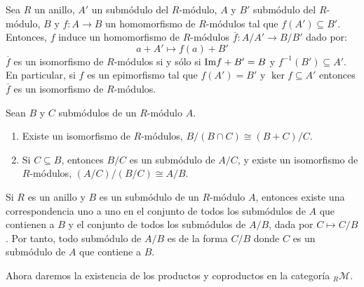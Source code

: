 \documentclass[12pt]{report}
\newcounter{it}
\theoremstyle{largebreak}
\newcommand\cf[3]{\ensuremath{#1:#2\rightarrow#3}}
\newcommand{\im}{\ensuremath{\textup{Im}}}
\begin{document}
    \begin{cor}
        Sea $R$ un anillo, $A'$ un submódulo del $R$-módulo, $A$ y $B'$ submódulo del $R$-módulo, $B$ y $\cf{f}{A}{B}$ un homomorfismo de $R$-módulos tal que $f(A')\subseteq B'$. Entonces, $f$ induce un homomorfismo de $R$-módulos $\cf{\overline{f}}{A/A'}{B/B'}$ dado por:
        \begin{equation*}
            a+A'\mapsto f(a)+B'
        \end{equation*}
        $\overline{f}$ es un isomorfismo de $R$-módulos si y sólo si $\im f+B'=B$ y $f^{-1}(B')\subseteq A'$. En particular, si $f$ es un epimorfismo tal que $f(A')=B'$ y $\ker f\subseteq A'$ entonces $\overline{f}$ es un isomorfismo de $R$-módulos.
    \end{cor}

    \begin{theor}
        Sean $B$ y $C$ submódulos de un $R$-módulo $A$.
        \begin{enumerate}[label = \textit{(\alph*)}]
            \item Existe un isomorfismo de $R$-módulos, $B/(B\cap C)\cong (B+C)/C$.
            \item Si $C\subseteq B$, entonces $B/C$ es un submódulo de $A/C$, y existe un isomorfismo de $R$-módulos, $(A/C)/(B/C)\cong A/B$.
        \end{enumerate}
    \end{theor}

    \begin{theor}
        Si $R$ es un anillo y $B$ es un submódulo de un $R$-módulo $A$, entonces existe una correspondencia uno a uno en el conjunto de todos los submódulos de $A$ que contienen a $B$ y el conjunto de todos los submódulos de $A/B$, dada por $C\mapsto C/B$. Por tanto, todo submódulo de $A/B$ es de la forma $C/B$ donde $C$ es un submódulo de $A$ que contiene a $B$. 
    \end{theor}

    Ahora daremos la existencia de los productos y coproductos en la categoría ${}_R\mathcal{M}$.
\end{document}
